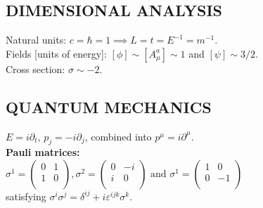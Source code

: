 \documentclass[a4paper, norsk, 8pt, landscape]{article}
\begin{document}
\footnotesize
\begin{multicols*}{3}

\subsection*{\footnotesize  DIMENSIONAL ANALYSIS}
Natural units: $c=\hbar=1 \implies L=t=E^{-1}=m^{-1}$. \\
Fields [units of energy]: $[\phi] \sim [A_\mu^a] \sim 1$ and $[\psi] \sim 3/2$. \\
Cross section: $\sigma \sim -2$.















\subsection*{\footnotesize QUANTUM MECHANICS}
$E=i\partial_t$, $p_j=-i\partial_j$, combined into $p^\mu = i \partial^\mu$. \\
 {\textbf{Pauli matrices:}} \\
$
\sigma^1 =
\left(\begin{matrix}
0 & 1 \\
1 & 0 \\
\end{matrix}\right),
\sigma^2 =
\left(\begin{matrix}
0 & -i \\
i & 0 \\
\end{matrix}\right) \text{ and }
\sigma^1 =
\left(\begin{matrix}
1 & 0 \\
0 & -1 \\
\end{matrix}\right)
$ \\
satisfying $\sigma^i \sigma^j= \delta^{ij}+i\varepsilon^{ijk}\sigma^k$.
\\



















\end{multicols*}
\end{document}
